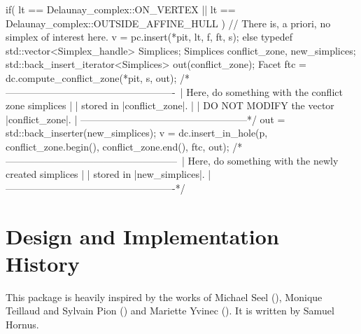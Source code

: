 {\begin{ccExampleCode}
{    if(    lt == Delaunay_complex::ON_VERTEX
        || lt == Delaunay_complex::OUTSIDE_AFFINE_HULL )
    {
        // There is, a priori, no simplex of interest here.
        v = pc.insert(*pit, lt, f, ft, s);
    }
    else
    {
        typedef std::vector<Simplex_handle> Simplices;
        Simplices conflict_zone, new_simplices;
        std::back_insert_iterator<Simplices> out(conflict_zone);
        Facet ftc = dc.compute_conflict_zone(*pit, s, out);
        /*----------------------------------------------------\
        | Here, do something with the conflict zone simplices |
        | stored in |conflict_zone|.                          |
        | DO NOT MODIFY the vector |conflict_zone|.           |
        \----------------------------------------------------*/
        out = std::back_inserter(new_simplices);
        v = dc.insert_in_hole(p, conflict_zone.begin(), conflict_zone.end(), ftc, out);
        /*-----------------------------------------------------\
        |  Here, do something with the newly created simplices |
        |  stored in |new_simplices|.                          |
        \-----------------------------------------------------*/
    }
}
\end{ccExampleCode}

\section{Design and Implementation History}

This package is heavily inspired by the works of Michael Seel
(), Monique Teillaud and Sylvain Pion ()
and Mariette Yvinec (\ccc{Triangulation_2}).
It is written by Samuel Hornus.
}
